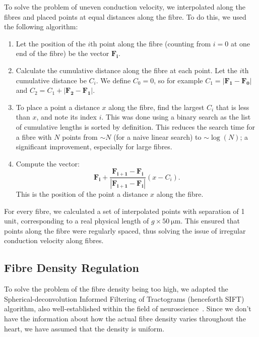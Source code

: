 To solve the problem of uneven conduction velocity, we interpolated along the fibres and placed points at equal distances along the fibre. To do this, we used the following algorithm:
\begin{enumerate}
    \item Let the position of the $i$th point along the fibre (counting from $i=0$ at one end of the fibre) be the vector $\mathbf{F_i}$.
    \item Calculate the cumulative distance along the fibre at each point. Let the $i$th cumulative distance be $C_i$. We define $C_0 = 0$, so for example $C_1 = \left| \mathbf{F_1} - \mathbf{F_0} \right|$ and $C_2 = C_1 + \left| \mathbf{F_2} - \mathbf{F_1} \right|$.
    \item To place a point a distance $x$ along the fibre, find the largest $C_i$ that is less than $x$, and note its index $i$. This was done using a binary search as the list of cumulative lengths is sorted by definition. This reduces the search time for a fibre with $N$ points from $\sim N$ (for a naive linear search) to $\sim \log(N)$; a significant improvement, especially for large fibres.
    \item Compute the vector: \begin{equation}
        \mathbf{F_i} + \frac{\mathbf{F_{i + 1}} - \mathbf{F_i}}{ \left| \mathbf{F_{i + 1}} - \mathbf{F_i} \right|} (x - C_i).
    \end{equation}
    This is the position of the point a distance $x$ along the fibre.
\end{enumerate}
For every fibre, we calculated a set of interpolated points with separation of 1 unit, corresponding to a real physical length of $g \times 50~\mathrm{\mu m}$. This ensured that points along the fibre were regularly spaced, thus solving the issue of irregular conduction velocity along fibres.

\subsection{Fibre Density Regulation}

To solve the problem of the fibre density being too high, we adapted the Spherical-deconvolution Informed Filtering of Tractograms (henceforth SIFT) algorithm, also well-established within the field of neuroscience~\cite{sift, stampfli2019subtle}. Since we don't have the information about how the actual fibre density varies throughout the heart, we have assumed that the density is uniform.

